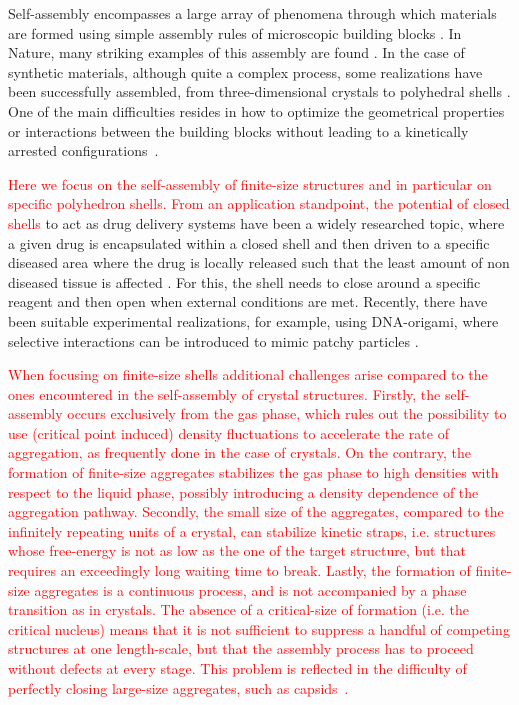 \documentclass[a4paper, amsfonts, amssymb, amsmath, reprint, showkeys, nofootinbib, twoside]{revtex4-1}
\begin{document}
Self-assembly encompasses a large array of phenomena through which materials are formed using simple assembly rules of microscopic building blocks \cite{Whitelam2015}. In Nature, many striking examples of this assembly are found \cite{Whitesides2002, Parnell2015, Teyssier2015}. In the case of synthetic materials, although quite a complex process, some realizations have been successfully assembled, from three-dimensional crystals to polyhedral shells \cite{Dziomkina2005, Glotzer2007, Kim2011, LaCour2022,  McGorty2010, Mu2022, Nykypanchuk2008, Sacanna2011, Wang2012, Wang2015, Joshi2016,Bishop2022}. One of the main difficulties resides in how to optimize the geometrical properties or interactions between the building blocks without leading to a kinetically arrested configurations~\cite{Frenkel2011, Lash2015, Blaaderen2006, Meulen2015}.

\textcolor{red}{Here we focus on the self-assembly of finite-size structures and in particular on specific polyhedron shells. 
From an application standpoint, the potential of closed shells} to act as drug delivery systems have been a widely researched topic, where a given drug is encapsulated within a closed shell and then driven to a specific diseased area where the drug is locally released such that the least amount of non diseased tissue is affected \cite{Huang2007, Uchida2007}. For this, the shell needs to close around a specific reagent and then open when external conditions are met. Recently, there have been suitable experimental realizations, for example, using DNA-origami, where selective interactions can be introduced to mimic patchy particles \cite{Mosayebi2017, Lee2022, Jun2021, Rothemund2006}.

\textcolor{red}{When focusing on finite-size shells additional challenges arise compared to the ones encountered in the self-assembly of crystal structures. Firstly, the self-assembly occurs exclusively from the gas phase, which rules out the possibility to use (critical point induced) density fluctuations to accelerate the rate of aggregation, as frequently done in the case of crystals. On the contrary, the formation of finite-size aggregates stabilizes the gas phase to high densities with respect to the liquid phase, possibly introducing a density dependence of the aggregation pathway. Secondly, the small size of the aggregates, compared to the infinitely repeating units of a crystal, can stabilize kinetic straps, i.e. structures whose free-energy is not as low as the one of the target structure, but that requires an exceedingly long waiting time to break. Lastly, the formation of finite-size aggregates is a continuous process, and is not accompanied by a phase transition as in crystals. The absence of a critical-size of formation (i.e. the critical nucleus) means that it is not sufficient to suppress a handful of competing structures at one length-scale, but that the assembly process has to proceed without defects at every stage. This problem is reflected in the difficulty of perfectly closing large-size aggregates, such as capsids~\cite{Mosayebi2017}.}
\end{document}
